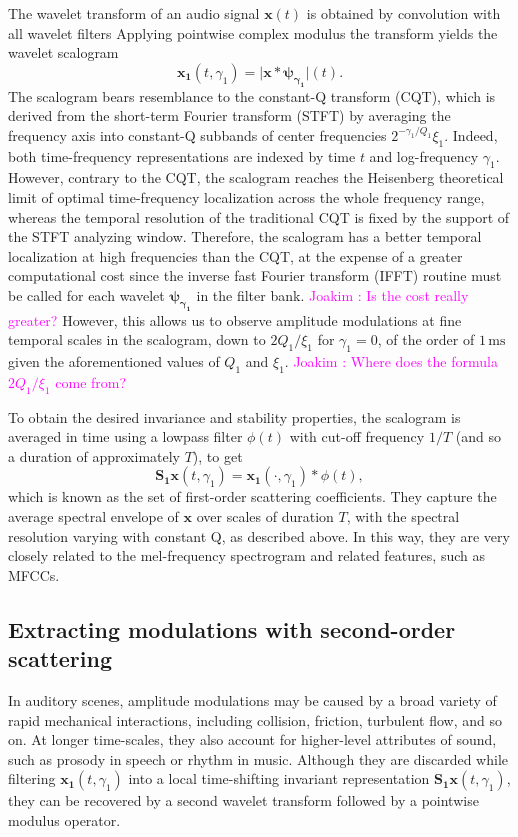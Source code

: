 \documentclass[journal]{IEEEtran}
\newcommand{\ja}[1]{\textcolor{magenta}{Joakim : #1}}
\begin{document}
The wavelet transform of an audio signal
$\boldsymbol{x}(t)$ is obtained by convolution with all wavelet filters
Applying pointwise complex modulus the transform yields
the wavelet scalogram
\begin{equation}
\boldsymbol{x_1}(t, \gamma_1)
= \vert \boldsymbol{x} \ast \boldsymbol{\psi_{\gamma_1}} \vert (t)\mbox{.}
\end{equation}
The scalogram bears resemblance to the constant-Q transform (CQT),
which is derived from the short-term Fourier transform (STFT) by averaging the frequency
axis into constant-Q subbands of center frequencies $2^{-\gamma_1/Q_1}\xi_1$.
Indeed, both time-frequency representations are indexed by time $t$ and log-frequency $\gamma_1$.
However, contrary to the CQT, the scalogram reaches the Heisenberg
theoretical limit of optimal time-frequency localization across the whole
frequency range, whereas the temporal resolution of the traditional CQT is fixed by the support of the STFT analyzing window. %
Therefore, the scalogram has a better temporal localization at high
frequencies than the CQT, at the expense of a greater computational cost
since the inverse fast Fourier transform (IFFT) routine must be called for each wavelet $\boldsymbol{\psi_{\gamma_1}}$ in the filter bank. \ja{Is the cost really greater?}
However, this allows us to observe amplitude modulations at fine temporal scales in the scalogram, down to $2Q_1/\xi_1$ for $\gamma_1 = 0$, of the order of $1\,\textrm{ms}$ given the aforementioned values of $Q_1$ and $\xi_1$. \ja{Where does the formula $2Q_1/\xi_1$ come from?}

To obtain the desired invariance and stability properties, the scalogram is averaged in time using a lowpass filter $\phi(t)$ with cut-off frequency $1/T$ (and so a duration of approximately $T$), to get
\begin{equation}
\mathbf{S_1}\boldsymbol{x}(t, \gamma_1) = \boldsymbol{x_1}(\cdot, \gamma_1) \ast \phi(t),
\end{equation}
which is known as the set of first-order scattering coefficients. They capture the average spectral envelope of $\boldsymbol{x}$ over scales of duration $T$, with the spectral resolution varying with constant Q, as described above. In this way, they are very closely related to the mel-frequency spectrogram and related features, such as MFCCs.

\subsection{Extracting modulations with second-order scattering}
In auditory scenes, amplitude modulations may be caused by a broad variety of rapid mechanical interactions, including collision, friction, turbulent flow, and so on.
At longer time-scales, they also account for higher-level attributes of sound, such as prosody in speech or rhythm in music.
Although they are discarded while filtering $\boldsymbol{x_1}(t,\gamma_1)$ into a local time-shifting invariant representation $\mathbf{S_1}\boldsymbol{x}(t,\gamma_1)$, they can be recovered by a second wavelet transform followed by a pointwise modulus operator.
\end{document}
